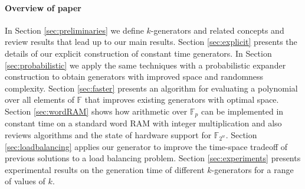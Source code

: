 \documentclass[a4paper,11pt]{article}
\theoremstyle{plain}
\theoremstyle{definition}
\newcommand{\F}{\mathbb{F}}
\begin{document}
\paragraph{Overview of paper}
In Section \ref{sec:preliminaries} we define \mbox{$k$-generators} and related concepts and review results that lead up to our main results.
Section \ref{sec:explicit} presents the details of our explicit construction of constant time generators. 
In Section \ref{sec:probabilistic} we apply the same techniques with a probabilistic expander construction to obtain generators with improved space and randomness complexity. 
Section \ref{sec:faster} presents an algorithm for evaluating a polynomial over all elements of $\F$ that improves existing generators with optimal space.
Section \ref{sec:wordRAM} shows how arithmetic over $\F_{p}$ can be implemented in constant time on a standard word RAM with integer multiplication and also reviews algorithms and the state of hardware support for $\F_{2^{w}}$.
Section \ref{sec:loadbalancing} applies our generator to improve the time-space tradeoff of previous solutions to a load balancing problem.
Section \ref{sec:experiments} presents experimental results on the generation time of different $k$-generators for a range of values of $k$. 
\end{document}
